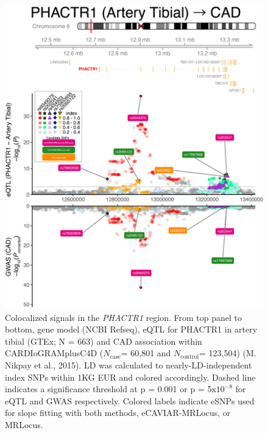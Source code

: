 \documentclass[11pt]{article}
\newcommand{\Ncase}{$N_{\textrm{case}}$\xspace}
\newcommand{\Ncontrol}{$N_{\textrm{control}}$\xspace}
\begin{document}
\begin{figure}[!ht]
  \centering
  \includegraphics[width=.7\textwidth]{figs/region/regionplot.PHACTR1_Artery_Tibial_CAD.20210114.edit.png}
  \caption{Colocalized signals in the \emph{PHACTR1} region. From top
    panel to bottom, gene model (NCBI Refseq), eQTL for PHACTR1 in
    artery tibial (GTEx; N = 663) and CAD association within
    CARDIoGRAMplusC4D (\Ncase = 60,801 and \Ncontrol = 123,504)
    (M. Nikpay et al., 2015). LD was calculated to
    nearly-LD-independent index SNPs within 1KG EUR and colored
    accordingly. Dashed line indicates a significance threshold at p =
    0.001 or p = 5x$10^{-8}$ for eQTL and GWAS respectively.
    Colored labels indicate eSNPs used for slope fitting with both
    methods, eCAVIAR-MRLocus, or MRLocus.}
\end{figure}
\end{document}
